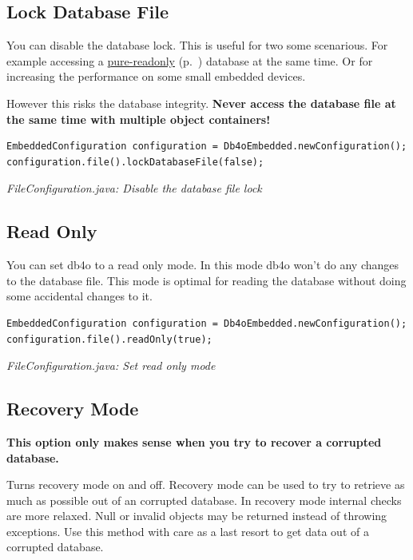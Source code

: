 \subsection{Lock Database File}
\label{ref:configuration-file-lock-database}

You can disable the database lock. This is useful for two some scenarious. For example accessing a \hyperref[ref:configuration-file-read-only]{pure-readonly} (p.~\pageref{ref:configuration-file-read-only}) database at the same time. Or for increasing the performance on some small embedded devices.

However this risks the database integrity.\textbf{ Never access the database file at the same time with multiple object containers!}

\begin{lstlisting}
EmbeddedConfiguration configuration = Db4oEmbedded.newConfiguration();
configuration.file().lockDatabaseFile(false);
\end{lstlisting}

{\small\itshape FileConfiguration.java: Disable the database file lock\par}
\medskip

\subsection{Read Only}
\label{ref:configuration-file-read-only}

You can set db4o to a read only mode. In this mode db4o won't do any changes to the database file. This mode is optimal for reading the database without doing some accidental changes to it.

\begin{lstlisting}
EmbeddedConfiguration configuration = Db4oEmbedded.newConfiguration();
configuration.file().readOnly(true);
\end{lstlisting}

{\small\itshape FileConfiguration.java: Set read only mode\par}
\medskip

\subsection{Recovery Mode}
\label{ref:configuration-file-recover-mode}

\textbf{This option only makes sense when you try to recover a corrupted database.}

Turns recovery mode on and off. Recovery mode can be used to try to retrieve as much as possible out of an corrupted database. In recovery mode internal checks are more relaxed. Null or invalid objects may be returned instead of throwing exceptions. Use this method with care as a last resort to get data out of a corrupted database.

